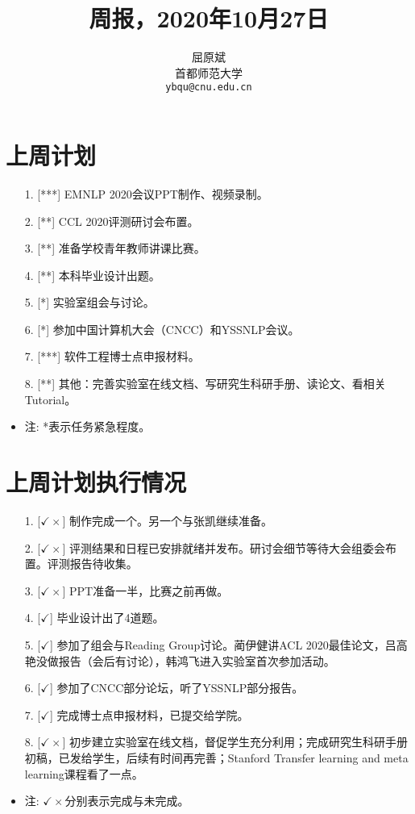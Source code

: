 \documentclass[11pt]{article}
\title{周报，2020年10月27日}
\author{屈原斌 \\
  首都师范大学 \\
    {\tt ybqu@cnu.edu.cn}}
\date{}
\begin{document}
\begin{CJK}{UTF8}{gkai}

\maketitle
\CJKindent


\section{上周计划}


\begin{itemize}
\item [1.] [***] EMNLP 2020会议PPT制作、视频录制。
\item [2.] [**] CCL 2020评测研讨会布置。
\item [3.] [**] 准备学校青年教师讲课比赛。
\item [4.] [**] 本科毕业设计出题。
\item [5.] [*] 实验室组会与讨论。
\item [6.] [*] 参加中国计算机大会（CNCC）和YSSNLP会议。
\item [7.] [***] 软件工程博士点申报材料。
\item [8.] [**] 其他：完善实验室在线文档、写研究生科研手册、读论文、看相关Tutorial。
\item 注: *表示任务紧急程度。
\end{itemize}



\section{上周计划执行情况}
\begin{itemize}
\item [1.] [$\checkmark \times$] 制作完成一个。另一个与张凯继续准备。
\item [2.] [$\checkmark \times$] 评测结果和日程已安排就绪并发布。研讨会细节等待大会组委会布置。评测报告待收集。
\item [3.] [$\checkmark \times$] PPT准备一半，比赛之前再做。
\item [4.] [$\checkmark$] 毕业设计出了4道题。
\item [5.] [$\checkmark $] 参加了组会与Reading Group讨论。蔺伊健讲ACL 2020最佳论文，吕高艳没做报告（会后有讨论），韩鸿飞进入实验室首次参加活动。
\item [6.] [$\checkmark$] 参加了CNCC部分论坛，听了YSSNLP部分报告。
\item [7.] [$\checkmark$] 完成博士点申报材料，已提交给学院。
\item [8.] [$\checkmark \times$] 初步建立实验室在线文档，督促学生充分利用；完成研究生科研手册初稿，已发给学生，后续有时间再完善；Stanford Transfer learning and meta learning课程看了一点。
\item 注: $\checkmark \times$分别表示完成与未完成。
\end{itemize}


\end{CJK}
\end{document}

